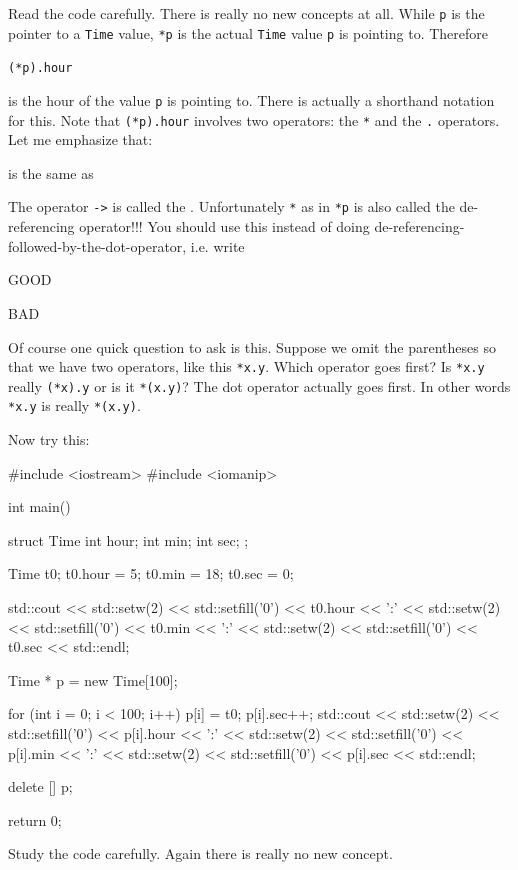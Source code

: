 Read the code carefully. There is really no new concepts at all. While \texttt{p}
is the pointer to a \texttt{Time} value, \verb!*p! is the actual \texttt{Time} value \texttt{p} is pointing
to. Therefore

\verb!(*p).hour!

is the hour of the value \texttt{p} is pointing to. There is actually a shorthand
notation for this. Note that \verb!(*p).hour! involves two operators: the \texttt{*} and
the \texttt{.} operators. Let me emphasize that:


is the same as


The operator \texttt{->} is called the .
Unfortunately \texttt{*} as in \verb!*p! is also called the de-referencing operator!!! You
should use this instead of doing de-referencing-followed-by-the-dot-operator, i.e. write

 \hspace{1cm} GOOD

 \hspace{1cm} BAD

Of course one quick question to ask is this. Suppose we omit the
parentheses so that we have two operators, like this \verb!*x.y!. Which
operator goes first? Is \verb!*x.y! really \verb!(*x).y! or is it \verb!*(x.y)!? The dot
operator actually goes first. In other words \verb!*x.y! is really \verb!*(x.y)!.


Now try this:

\begin{consolethree}[escapeinside=||]
#include <iostream>
#include <iomanip>

int main()
{
  struct Time
  {
    int hour;
    int min;
    int sec;
  };

  Time t0;
  t0.hour = 5;
  t0.min = 18;
  t0.sec = 0;

  std::cout
    << std::setw(2) << std::setfill('0') << t0.hour
    << ':'
    << std::setw(2) << std::setfill('0') << t0.min
    << ':'
    << std::setw(2) << std::setfill('0') << t0.sec
    << std::endl;

  Time * p = new Time[100];

  for (int i = 0; i < 100; i++)
  {
    p[i] = t0;
    p[i].sec++;
    std::cout
      << std::setw(2) << std::setfill('0') << p[i].hour
      << ':'
      << std::setw(2) << std::setfill('0') << p[i].min
      << ':'
      << std::setw(2) << std::setfill('0') << p[i].sec
      << std::endl;
  }

  delete [] p;

  return 0;
}
\end{consolethree}

Study the code carefully. Again there is really no new concept.



